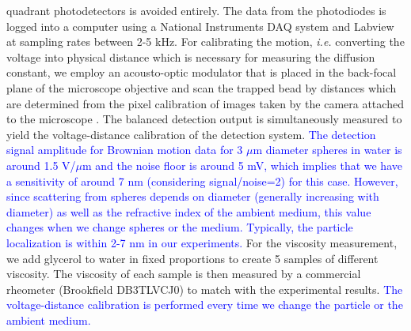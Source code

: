 \documentclass[fleqn,10pt]{wlscirep}
\begin{document}
quadrant photodetectors is avoided entirely.\textcolor{blue}{{} }The
data from the photodiodes is logged into a computer using a National
Instruments DAQ system and Labview at sampling rates between 2-5 kHz.
For calibrating the motion, \emph{i.e.} converting the voltage into
physical distance which is necessary for measuring the diffusion constant,
we employ an acousto-optic modulator that is placed in the back-focal
plane of the microscope objective and scan the trapped bead by distances
which are determined from the pixel calibration of images taken by
the camera attached to the microscope \cite{rsi12}. The balanced
detection output is simultaneously measured to yield the voltage-distance
calibration of the detection system. \textcolor{blue}{The detection
signal amplitude for Brownian motion data for 3 $\mu$m diameter spheres
in water is around 1.5 V/$\mu$m and the noise floor is around 5 mV,
which implies that we have a sensitivity of around 7 nm (considering
signal/noise=2) for this case. However, since scattering from spheres
depends on diameter (generally increasing with diameter) as well as
the refractive index of the ambient medium, this value changes when
we change spheres or the medium. Typically, the particle localization
is within 2-7 nm in our experiments. }For the viscosity measurement,
we add glycerol to water in fixed proportions to create 5 samples
of different viscosity. The viscosity of each sample is then measured
by a commercial rheometer (Brookfield DB3TLVCJ0) to match with the
experimental results. \textcolor{blue}{The voltage-distance calibration
is performed every time we change the particle or the ambient medium.}
\end{document}
